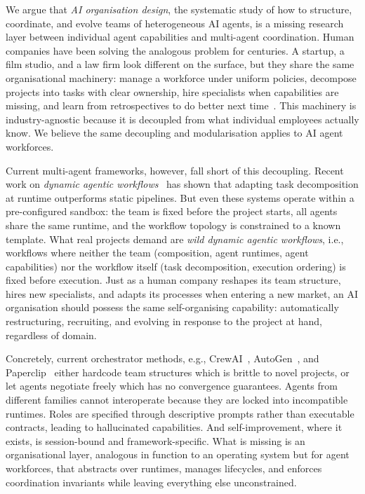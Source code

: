 \documentclass[11pt,a4paper]{article}
\begin{document}
We argue that \emph{AI organisation design}, the systematic study of how to structure, coordinate, and evolve teams of heterogeneous AI agents, is a missing research layer between individual agent capabilities and multi-agent coordination.  Human companies have been solving the analogous problem for centuries.  A startup, a film studio, and a law firm look different on the surface, but they share the same organisational machinery: manage a workforce under uniform policies, decompose projects into tasks with clear ownership, hire specialists when capabilities are missing, and learn from retrospectives to do better next time~\cite{reason:Simon96a}.  This machinery is industry-agnostic because it is decoupled from what individual employees actually know.  We believe the same decoupling and modularisation applies to AI agent workforces.

Current multi-agent frameworks, however, fall short of this decoupling.  Recent work on \emph{dynamic agentic workflows}~\cite{wang2025tdag, erdogan2025planact, hu2025evomac} has shown that adapting task decomposition at runtime outperforms static pipelines.  But even these systems operate within a pre-configured sandbox: the team is fixed before the project starts, all agents share the same runtime, and the workflow topology is constrained to a known template.  What real projects demand are \emph{wild dynamic agentic workflows}, i.e., workflows where neither the team (composition, agent runtimes, agent capabilities) nor the workflow itself (task decomposition, execution ordering) is fixed before execution.  Just as a human company reshapes its team structure, hires new specialists, and adapts its processes when entering a new market, an AI organisation should possess the same self-organising capability: automatically restructuring, recruiting, and evolving in response to the project at hand, regardless of domain.

Concretely, current orchestrator methods, e.g., CrewAI~\cite{crewai}, AutoGen~\cite{autogen}, and Paperclip~\cite{paperclip2025} either hardcode team structures which is brittle to novel projects, or let agents negotiate freely which has no convergence guarantees.  Agents from different families cannot interoperate because they are locked into incompatible runtimes.  Roles are specified through descriptive prompts rather than executable contracts, leading to hallucinated capabilities.  And self-improvement, where it exists, is session-bound and framework-specific.  What is missing is an organisational layer, analogous in function to an operating system but for agent workforces, that abstracts over runtimes, manages lifecycles, and enforces coordination invariants while leaving everything else unconstrained.
\end{document}
